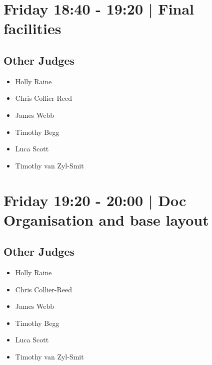 \documentclass[10pt, A5]{article}
\begin{document}
            \section*{Friday 18:40
        -
        19:20
        |
         Final facilities}
        
                
        \subsection*{Other Judges}
        
            \begin{itemize}
                            \item Holly Raine
                            \item Chris Collier-Reed
                            \item James Webb
                            \item Timothy Begg
                            \item Luca Scott
                            \item Timothy van Zyl-Smit
                        \end{itemize}
        

            \section*{Friday 19:20
        -
        20:00
        |
         Doc Organisation and base layout}
        
                
        \subsection*{Other Judges}
        
            \begin{itemize}
                            \item Holly Raine
                            \item Chris Collier-Reed
                            \item James Webb
                            \item Timothy Begg
                            \item Luca Scott
                            \item Timothy van Zyl-Smit
                        \end{itemize}
        
\end{document}
